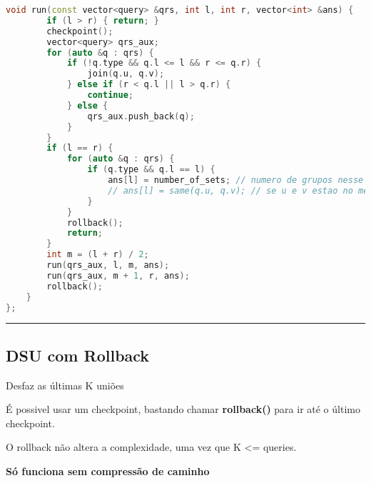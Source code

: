 \documentclass[11pt, a4paper, twoside]{book}
\begin{document}
\begin{lstlisting}[language=C++]
    void run(const vector<query> &qrs, int l, int r, vector<int> &ans) {
        if (l > r) { return; }
        checkpoint();
        vector<query> qrs_aux;
        for (auto &q : qrs) {
            if (!q.type && q.l <= l && r <= q.r) {
                join(q.u, q.v);
            } else if (r < q.l || l > q.r) {
                continue;
            } else {
                qrs_aux.push_back(q);
            }
        }
        if (l == r) {
            for (auto &q : qrs) {
                if (q.type && q.l == l) {
                    ans[l] = number_of_sets; // numero de grupos nesse tempo
                    // ans[l] = same(q.u, q.v); // se u e v estao no mesmo grupo
                }
            }
            rollback();
            return;
        }
        int m = (l + r) / 2;
        run(qrs_aux, l, m, ans);
        run(qrs_aux, m + 1, r, ans);
        rollback();
    }
};
\end{lstlisting}

\hfill

\rule{\textwidth}{0.4pt}

\subsection{DSU com Rollback}



Desfaz as últimas K uniões





É possivel usar um checkpoint, bastando chamar \textbf{rollback()} para ir até o último checkpoint.  

O rollback não altera a complexidade, uma vez que K <= queries.  

\textbf{Só funciona sem compressão de caminho}




\hfill
\end{document}
